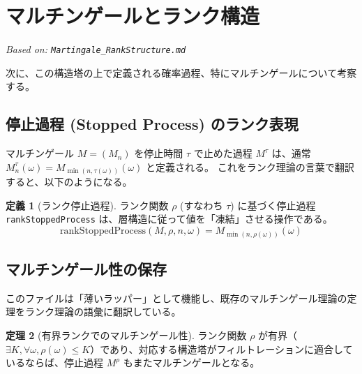 \documentclass[a4paper,11pt]{ltjsarticle}
\theoremstyle{definition}
\newtheorem{definition}{定義}[section]
\newtheorem{theorem}[definition]{定理}
\newcommand{\Tau}{\tau}
\newcommand{\Rank}{\rho}
\begin{document}
\section{マルチンゲールとランク構造}
\label{sec:martingale}
\textit{Based on: \texttt{Martingale\_RankStructure.md}}

次に、この構造塔の上で定義される確率過程、特にマルチンゲールについて考察する。

\subsection{停止過程 (Stopped Process) のランク表現}
マルチンゲール $M = (M_n)$ を停止時間 $\Tau$ で止めた過程 $M^\Tau$ は、通常 $M^\Tau_n(\omega) = M_{\min(n, \Tau(\omega))}(\omega)$ と定義される。
これをランク理論の言葉で翻訳すると、以下のようになる。

\begin{definition}[ランク停止過程]
ランク関数 $\Rank$ (すなわち $\Tau$) に基づく停止過程 \texttt{rankStoppedProcess} は、層構造に従って値を「凍結」させる操作である。
\[
    \text{rankStoppedProcess}(M, \Rank, n, \omega) = M_{\min(n, \Rank(\omega))}(\omega)
\]
\end{definition}

\subsection{マルチンゲール性の保存}
このファイルは「薄いラッパー」として機能し、既存のマルチンゲール理論の定理をランク理論の語彙に翻訳している。

\begin{theorem}[有界ランクでのマルチンゲール性]
ランク関数 $\Rank$ が有界（$\exists K, \forall \omega, \Rank(\omega) \le K$）であり、対応する構造塔がフィルトレーションに適合しているならば、停止過程 $M^\Rank$ もまたマルチンゲールとなる。
\end{theorem}
\end{document}

